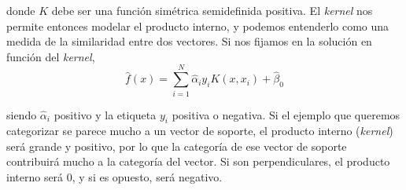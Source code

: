 donde $K$ debe ser una función simétrica semidefinida positiva. El \textit{kernel} nos permite entonces modelar el producto interno, y podemos entenderlo como una medida de la similaridad entre dos vectores. Si nos fijamos en la solución en función del \textit{kernel}, 
\begin{equation}
\hat{f}(x) = \sum_{i = 1}^N \hat{\alpha}_i y_i K(x, x_i) + \hat{\beta}_0
\end{equation}

\noindent siendo $\hat{\alpha}_i$ positivo y la etiqueta $y_i$ positiva o negativa. Si el ejemplo que queremos categorizar se parece mucho a un vector de soporte, el producto interno (\textit{kernel}) será grande y positivo, por lo que la categoría de ese vector de soporte contribuirá mucho a la categoría del vector. Si son perpendiculares, el producto interno será 0, y si es opuesto, será negativo. \\

